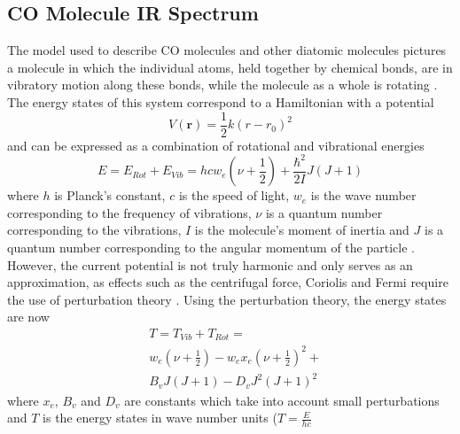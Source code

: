 \documentclass[reprint,amsmath,amssymb,aps, prl,superscriptaddress]{revtex4-2}
\begin{document}
\subsection{CO Molecule IR Spectrum}
The model used to describe CO molecules
and other diatomic molecules pictures a molecule in which the individual atoms, held together by chemical bonds, are in vibratory motion along these bonds, while the molecule as a whole is rotating \cite{alpert}. The energy states of this system correspond to a Hamiltonian with a potential 
\begin{equation} \label{eq:CO_Potential}
V(\boldsymbol{r})=\frac{1}{2}k(r-r_0)^2
\end{equation}
and can be expressed as a combination of rotational and vibrational energies
\begin{equation} \label{eq:CO_RotVibEnrg}
E=E_{Rot}+E_{Vib}= hcw_{e}(\nu +\frac{1}{2}) + \frac{\hbar  ^2}{2I}J(J+1)
\end{equation}
where $h$ is Planck's constant, $c$ is the speed of light, $w_{e}$ is the wave number corresponding to the frequency of vibrations, $\nu$ is a quantum number corresponding to the vibrations,  $I$ is the molecule's moment of inertia and $J$ is a quantum number corresponding to the angular momentum of the particle \cite{griffithsQM}. However, the  current potential is not truly harmonic and only serves as an approximation,
as effects such as the centrifugal force, Coriolis and Fermi \cite{alpert} require the use of perturbation theory \cite{samurai}. Using the perturbation theory, the energy states are now
\begin{equation} \label{eq:CO_PeturbRotVibEnrg}
\begin{split}
& T=T_{Vib}+T_{Rot}=\\
& w_{e}(\nu +\frac{1}{2}) -w_{e}x_{e}(\nu +\frac{1}{2})^2+ \\
& B_{v}J(J+1)-D_{v}J^2(J+1)^2 
\end{split}
\end{equation}
where $x_{e}$, $B_{v}$ and $D_{v}$ are constants which take into account small perturbations and $T$ is the energy states in wave number units ($T=\frac{E}{hc}$
\end{document}

